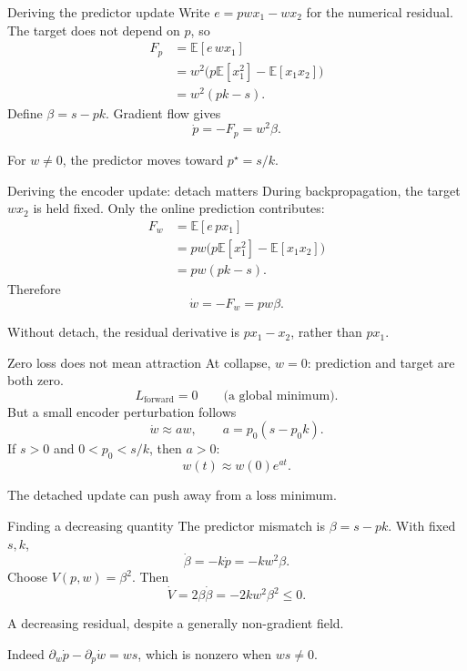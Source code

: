 \documentclass[aspectratio=169]{beamer}
\begin{document}
\begin{frame}{Deriving the predictor update}
  Write $e=pwx_1-wx_2$ for the numerical residual.
  The target does not depend on $p$, so
  \begin{align*}
    F_p&=\mathbb E[e\,wx_1]\\
       &=w^2\big(p\mathbb E[x_1^2]-\mathbb E[x_1x_2]\big)\\
       &=w^2(pk-s).
  \end{align*}
  Define $\beta=s-pk$. Gradient flow gives
  \[
    \boxed{\dot p=-F_p=w^2\beta.}
  \]
  \begin{center}
    For $w\ne0$, the predictor moves toward $p^\star=s/k$.
  \end{center}
\end{frame}

\begin{frame}{Deriving the encoder update: detach matters}
  During backpropagation, the target $wx_2$ is held fixed.
  Only the online prediction contributes:
  \begin{align*}
    F_w&=\mathbb E[e\,px_1]\\
       &=pw\big(p\mathbb E[x_1^2]-\mathbb E[x_1x_2]\big)\\
       &=pw(pk-s).
  \end{align*}
  Therefore
  \[
    \boxed{\dot w=-F_w=pw\beta.}
  \]
  \begin{center}
    Without detach, the residual derivative is $px_1-x_2$,
    rather than $px_1$.
  \end{center}
\end{frame}

\begin{frame}{Zero loss does not mean attraction}
  At collapse, $w=0$: prediction and target are both zero.
  \[
    L_{\mathrm{forward}}=0 \qquad \text{(a global minimum).}
  \]
  But a small encoder perturbation follows
  \[
    \dot w\approx aw,\qquad a=p_0(s-p_0k).
  \]
  If $s>0$ and $0<p_0<s/k$, then $a>0$:
  \[
    w(t)\approx w(0)e^{at}.
  \]
  \begin{center}
    \alert{The detached update can push away from a loss minimum.}
  \end{center}
\end{frame}

\begin{frame}{Finding a decreasing quantity}
  The predictor mismatch is $\beta=s-pk$.
  With fixed $s,k$,
  \[
    \dot\beta=-k\dot p=-kw^2\beta.
  \]
  Choose $V(p,w)=\beta^2$. Then
  \[
    \boxed{\dot V=2\beta\dot\beta=-2kw^2\beta^2\leq0.}
  \]
  \begin{center}
    \alert{A decreasing residual, despite a generally non-gradient field.}
  \end{center}
  {\small Indeed $\partial_w\dot p-\partial_p\dot w=ws$,
  which is nonzero when $ws\ne0$.}
\end{frame}
\end{document}
